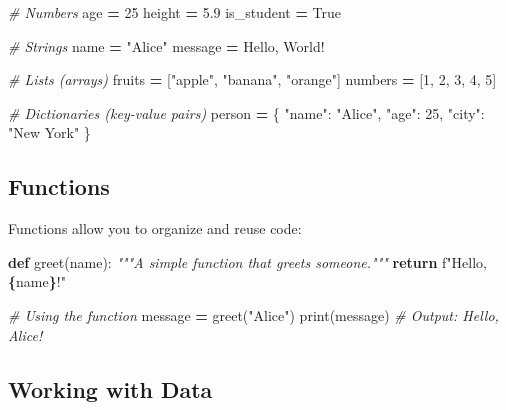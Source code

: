 \documentclass[
]{book}
\newenvironment{Shaded}{\begin{snugshade}}{\end{snugshade}}
\newcommand{\BuiltInTok}[1]{#1}
\newcommand{\CommentTok}[1]{\textcolor[rgb]{0.56,0.35,0.01}{\textit{#1}}}
\newcommand{\ControlFlowTok}[1]{\textcolor[rgb]{0.13,0.29,0.53}{\textbf{#1}}}
\newcommand{\DecValTok}[1]{\textcolor[rgb]{0.00,0.00,0.81}{#1}}
\newcommand{\FloatTok}[1]{\textcolor[rgb]{0.00,0.00,0.81}{#1}}
\newcommand{\KeywordTok}[1]{\textcolor[rgb]{0.13,0.29,0.53}{\textbf{#1}}}
\newcommand{\NormalTok}[1]{#1}
\newcommand{\OperatorTok}[1]{\textcolor[rgb]{0.81,0.36,0.00}{\textbf{#1}}}
\newcommand{\SpecialCharTok}[1]{\textcolor[rgb]{0.81,0.36,0.00}{\textbf{#1}}}
\newcommand{\SpecialStringTok}[1]{\textcolor[rgb]{0.31,0.60,0.02}{#1}}
\newcommand{\StringTok}[1]{\textcolor[rgb]{0.31,0.60,0.02}{#1}}
\newcommand{\VariableTok}[1]{\textcolor[rgb]{0.00,0.00,0.00}{#1}}
\begin{document}
\begin{Shaded}
\begin{Highlighting}[]
\CommentTok{\# Numbers}
\NormalTok{age }\OperatorTok{=} \DecValTok{25}
\NormalTok{height }\OperatorTok{=} \FloatTok{5.9}
\NormalTok{is\_student }\OperatorTok{=} \VariableTok{True}

\CommentTok{\# Strings}
\NormalTok{name }\OperatorTok{=} \StringTok{"Alice"}
\NormalTok{message }\OperatorTok{=} \StringTok{\textquotesingle{}Hello, World!\textquotesingle{}}

\CommentTok{\# Lists (arrays)}
\NormalTok{fruits }\OperatorTok{=}\NormalTok{ [}\StringTok{"apple"}\NormalTok{, }\StringTok{"banana"}\NormalTok{, }\StringTok{"orange"}\NormalTok{]}
\NormalTok{numbers }\OperatorTok{=}\NormalTok{ [}\DecValTok{1}\NormalTok{, }\DecValTok{2}\NormalTok{, }\DecValTok{3}\NormalTok{, }\DecValTok{4}\NormalTok{, }\DecValTok{5}\NormalTok{]}

\CommentTok{\# Dictionaries (key{-}value pairs)}
\NormalTok{person }\OperatorTok{=}\NormalTok{ \{}
    \StringTok{"name"}\NormalTok{: }\StringTok{"Alice"}\NormalTok{,}
    \StringTok{"age"}\NormalTok{: }\DecValTok{25}\NormalTok{,}
    \StringTok{"city"}\NormalTok{: }\StringTok{"New York"}
\NormalTok{\}}
\end{Highlighting}
\end{Shaded}

\subsection{Functions}\label{functions}

Functions allow you to organize and reuse code:

\begin{Shaded}
\begin{Highlighting}[]
\KeywordTok{def}\NormalTok{ greet(name):}
    \CommentTok{"""A simple function that greets someone."""}
    \ControlFlowTok{return} \SpecialStringTok{f"Hello, }\SpecialCharTok{\{}\NormalTok{name}\SpecialCharTok{\}}\SpecialStringTok{!"}

\CommentTok{\# Using the function}
\NormalTok{message }\OperatorTok{=}\NormalTok{ greet(}\StringTok{"Alice"}\NormalTok{)}
\BuiltInTok{print}\NormalTok{(message)  }\CommentTok{\# Output: Hello, Alice!}
\end{Highlighting}
\end{Shaded}

\subsection{Working with Data}\label{working-with-data}
\end{document}
